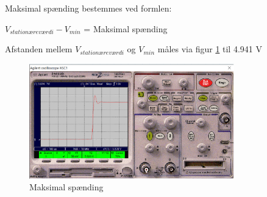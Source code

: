 Maksimal spænding bestemmes ved formlen:
\begin{center}
$V_{stationæreværdi} - V_{min}$ = Maksimal spænding
\end{center}

Afstanden mellem $V_{stationæreværdi}$ og $V_{min}$ måles via figur \ref{10k_max} til 4.941 V

\begin{figure}[h]
 \begin{center}
  \includegraphics[height=5cm]{P_Fig/figur9_1k_max}
  \caption{Maksimal spænding}
  \label{10k_max}
 \end{center}
\end{figure}